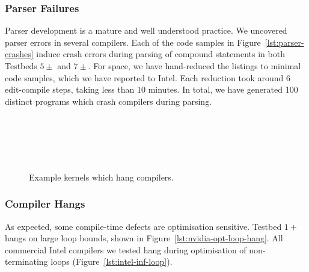 \subsubsection{Parser Failures}

Parser development is a mature and well understood practice. We uncovered parser
errors in several compilers. Each of the code samples in
Figure~\ref{lst:parser-crashes} induce crash errors during parsing of compound
statements in both Testbeds $5\pm$ and $7\pm$. For space, we have hand-reduced
the listings to minimal code samples, which we have reported to Intel. Each
reduction took around 6 edit-compile steps, taking less than 10 minutes. In
total, we have generated 100 distinct programs which crash compilers during
parsing.

\begin{figure}
  \centering %
  \\%
  \\%
  \\%
  \\%
  \caption[Example kernels which hang compilers]{Example kernels which hang compilers.}%
  \label{lst:compiler-hangs}
\end{figure}

\subsubsection{Compiler Hangs}

As expected, some compile-time defects are optimisation sensitive. Testbed $1+$
hangs on large loop bounds, shown in Figure~\ref{lst:nvidia-opt-loop-hang}. All
commercial Intel compilers we tested hang during optimisation of non-terminating
loops (Figure~\ref{lst:intel-inf-loop}).

